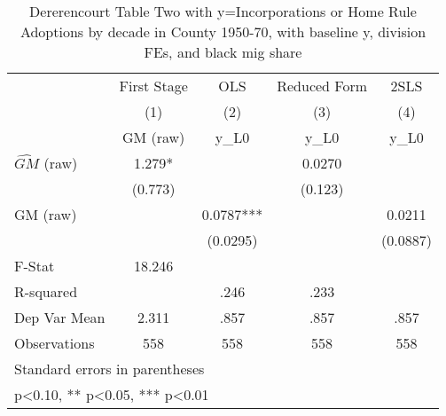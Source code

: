 \begin{table}[htbp]\centering
\def\sym#1{\ifmmode^{#1}\else\(^{#1}\)\fi}
\caption{Dererencourt Table Two with y=Incorporations or Home Rule Adoptions by decade in County 1950-70, with baseline y, division FEs, and black mig share}
\begin{tabular}{l*{4}{c}}
\toprule
                    & First Stage   &         OLS   &Reduced Form   &        2SLS   \\
                    &\multicolumn{1}{c}{(1)}&\multicolumn{1}{c}{(2)}&\multicolumn{1}{c}{(3)}&\multicolumn{1}{c}{(4)}\\
                    &\multicolumn{1}{c}{GM  (raw)}&\multicolumn{1}{c}{y\_L0}&\multicolumn{1}{c}{y\_L0}&\multicolumn{1}{c}{y\_L0}\\
\midrule
$\hat{GM}$ (raw)    &       1.279*  &               &      0.0270   &               \\
                    &     (0.773)   &               &     (0.123)   &               \\
\addlinespace
GM  (raw)           &               &      0.0787***&               &      0.0211   \\
                    &               &    (0.0295)   &               &    (0.0887)   \\
\midrule
F-Stat              &      18.246   &               &               &               \\
R-squared           &               &        .246   &        .233   &               \\
Dep Var Mean        &       2.311   &        .857   &        .857   &        .857   \\
Observations        &         558   &         558   &         558   &         558   \\
\bottomrule
\multicolumn{5}{l}{\footnotesize Standard errors in parentheses}\\
\multicolumn{5}{l}{\footnotesize * p<0.10, ** p<0.05, *** p<0.01}\\
\end{tabular}
\end{table}
